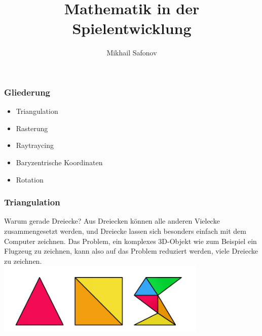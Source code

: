 \documentclass{beamer}
\title{Mathematik in der Spielentwicklung}
\date{}
\author{Mikhail Safonov}  %
\institute{}  %
\begin{document}
	
	\maketitle
	
\begin{frame}
	\frametitle{Gliederung}
	\centering
	\begin{minipage}{0.5\textwidth}
		\centering
	\end{minipage}%
	\begin{minipage}{0.45\textwidth}
		\begin{itemize}
			\small
			\item Triangulation
			\item Rasterung
			\item Raytraycing
			\item Baryzentrische Koordinaten
			\item Rotation
		\end{itemize}
	\end{minipage}
\end{frame}

\begin{frame}
	\frametitle{Triangulation}
	\vspace{0.5cm}
	\textmd{\small Warum gerade Dreiecke? Aus Dreiecken können alle anderen Vielecke zusammengesetzt werden, und Dreiecke lassen sich besonders einfach mit dem Computer zeichnen. Das Problem, ein komplexes 3D-Objekt wie zum Beispiel ein Flugzeug zu zeichnen, kann also auf das Problem reduziert werden, viele Dreiecke zu zeichnen.} \\
	\vspace{0.3cm} %
	\centering
	\includegraphics[width=10cm]{bilder/triangles-.png}
	
\end{frame}
\end{document}
